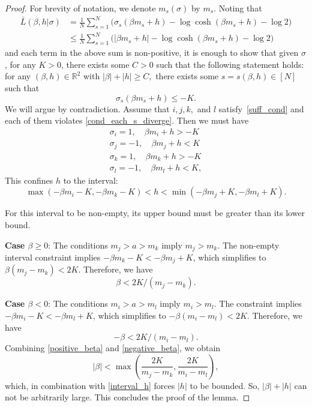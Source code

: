 \documentclass[letterpaper,11pt,reqno]{amsart}
\renewcommand{\le}{\leqslant}
\renewcommand{\ge}{\geqslant}
\renewcommand{\geq}{\geqslant}
\newcommand{\mvgs}{{\sigma}}
\begin{document}
\begin{proof}
For brevity of notation, we denote $m_s(\sigma)$ by $m_s$. Noting that   \begin{align*}
\bar{L}(\beta, h| \mvgs)  &= \frac1N\sum_{s=1}^N  \Big( \sigma_s( \beta m_s +h)  - \log \cosh ( \beta m_s +h) -\log 2\Big) \\
  &\le \frac1N \sum_{s=1}^N  \Big( | \beta m_s +h|  - \log \cosh ( \beta m_s +h) - \log 2\Big)
\end{align*}  
and each term in the above sum is non-positive, it is enough to show that given $\mvgs$, for any $K>0$, there exists some $C>0$ such that the following statement holds: for any $(\beta,h)\in \mathbb{R}^2$ with $|\beta|+|h|\geq C,$ there exists some $s=s(\beta,h)\in [N]$ such that 
\begin{equation}\label{cond_each_s_diverge}
   \sigma_s( \beta m_s +h)  \le -K. 
\end{equation}
We will argue by contradiction. Assume that $i, j, k,$ and $l$ satisfy~\eqref{suff_cond} and each of them violates \eqref{cond_each_s_diverge}.  Then we must have
\begin{align*}
    \sigma_i = 1, \quad \beta m_i + h >  - K \\
    \sigma_j = -1, \quad \beta m_j + h <  K \\
    \sigma_k = 1, \quad \beta m_k + h >-  K \\
    \sigma_l = -1, \quad \beta m_l + h <  K,
\end{align*}
This confines $h$ to the interval:
\begin{equation}\label{interval_h}
 \max(-\beta m_i - K, -\beta m_k - K) < h < \min(-\beta m_j + K, -\beta m_l + K).   
\end{equation}

For this interval to be non-empty, its upper bound must be greater than its lower bound.

 \textbf{Case $\beta \ge 0$}: The conditions $m_j > a > m_k$ imply $m_j > m_k$. The non-empty interval constraint implies $-\beta m_k - K < -\beta m_j + K$, which simplifies to $\beta(m_j - m_k) < 2K$. Therefore, we have 
    \begin{equation}\label{positive_beta}
     \beta < 2K/(m_j - m_k).
    \end{equation}
    
 \textbf{Case $\beta < 0$}:  The conditions $m_i > a > m_l$ imply $m_i > m_l$. The constraint implies $-\beta m_i - K < -\beta m_l + K$, which simplifies to $-\beta(m_i - m_l) < 2K$. 
        Therefore, we have 
            \begin{equation}\label{negative_beta}
 - \beta < 2K/(m_i - m_l).
 \end{equation}
Combining \eqref{positive_beta} and \eqref{negative_beta}, we obtain
\[ |\beta| < \max \left (\frac{2K}{m_j - m_k}, \frac{2K}{m_i - m_l}  \right),  \]
which, in combination with \eqref{interval_h} forces $|h|$ to be bounded. So, $|\beta| + |h|$ can not be arbitrarily large. This concludes the proof of the lemma.
\end{proof}
\end{document}
